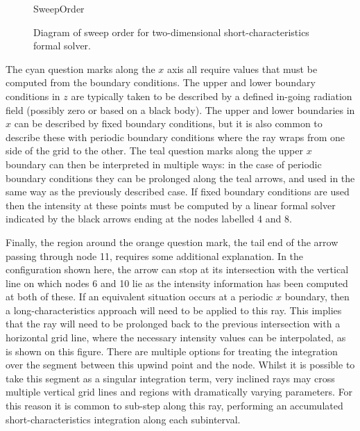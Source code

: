 \begin{figure}
\centering
{SweepOrder}
\caption{Diagram of sweep order for two-dimensional short-characteristics formal solver.}
\label{Fig:2DSweep}
\end{figure}

The {\color{TolCyan} cyan} question marks along the $x$ axis all require values that must be computed from the boundary conditions.
The upper and lower boundary conditions in $z$ are typically taken to be described by a defined in-going radiation field (possibly zero or based on a black body).
The upper and lower boundaries in $x$ can be described by fixed boundary conditions, but it is also common to describe these with periodic boundary conditions where the ray wraps from one side of the grid to the other.
The {\color{TolTeal} teal} question marks along the upper $x$ boundary can then be interpreted in multiple ways: in the case of periodic boundary conditions they can be prolonged along the {\color{TolTeal} teal} arrows, and used in the same way as the previously described case.
If fixed boundary conditions are used then the intensity at these points must be computed by a linear formal solver indicated by the black arrows ending at the nodes labelled 4 and 8.

Finally, the region around the {\color{TolOrange} orange} question mark, the tail end of the arrow passing through node 11, requires some additional explanation.
In the configuration shown here, the arrow can stop at its intersection with the vertical line on which nodes 6 and 10 lie as the intensity information has been computed at both of these.
If an equivalent situation occurs at a periodic $x$ boundary, then a long-characteristics approach will need to be applied to this ray.
This implies that the ray will need to be prolonged back to the previous intersection with a horizontal grid line, where the necessary intensity values can be interpolated, as is shown on this figure.
There are multiple options for treating the integration over the segment between this upwind point and the node.
Whilst it is possible to take this segment as a singular integration term, very inclined rays may cross multiple vertical grid lines and regions with dramatically varying parameters.
For this reason it is common to sub-step along this ray, performing an accumulated short-characteristics integration along each subinterval.

